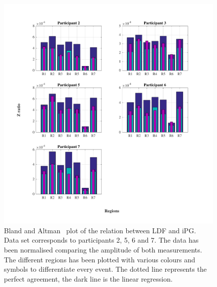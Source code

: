 \begin{figure}[!htpb]
	\includegraphics[width=1\textwidth,keepaspectratio]{figure2}    
	\caption[Bland and Altman plot of the relation between LDF and iPG]{Bland and Altman~\cite{bland1986statistical} plot of the relation between LDF and iPG. Data set corresponds to participants 2, 5, 6 and 7. The data has been normalised comparing the amplitude of both measurements. The different regions has been plotted with various colours and symbols to differentiate every event. The dotted line represents the perfect agreement, the dark line is the linear regression.}
	\label{fig:ration Z bar}
\end{figure}
